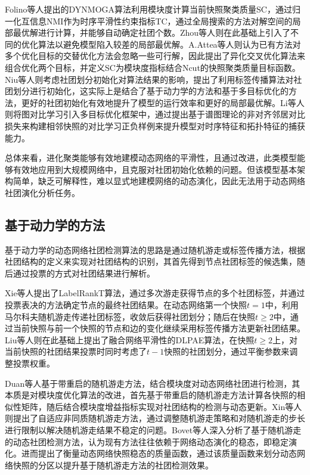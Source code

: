 Folino等人\cite{folino2013evolutionary}提出的DYNMOGA算法利用模块度计算当前快照聚类质量SC，通过归一化互信息NMI作为时序平滑性约束指标TC，通过全局搜索的方法对解空间的局部最优解进行计算，并能够自动确定社团个数。Zhou等人\cite{zhou2015multiobjective,zhou2017multiobjective}则在此基础上引入了不同的优化算法以避免模型陷入较差的局部最优解。A.Attea等人\cite{bara2016new}则认为已有方法对多个优化目标的交替优化方法会忽略一些可行解，因此提出了异化交叉优化算法来组合优化两个目标，并定义SC为模块度指标结合Ncut\cite{NEURIPS2024_a3017a8d}的快照聚类质量目标函数。Niu等人\cite{niu2017label}则考虑社团划分初始化对算法结果的影响，提出了利用标签传播算法对社团划分进行初始化，这实际上是结合了基于动力学的方法和基于多目标优化的方法，更好的社团初始化有效地提升了模型的运行效率和更好的局部最优解。Li等人\cite{LI2025129548}则将图对比学习引入多目标优化框架中，通过提出基于谱图理论的非对齐邻居对比损失来构建相邻快照的对比学习正负样例来提升模型对时序特征和拓扑特征的捕获能力。

总体来看，进化聚类能够有效地建模动态网络的平滑性，且通过改进，此类模型能够有效地应用到大规模网络中，且克服对社团初始化依赖的问题。但该模型基本架构简单，缺乏可解释性，难以显式地建模网络的动态演化，因此无法用于动态网络社团演化分析任务。

\subsection{基于动力学的方法}

基于动力学的动态网络社团检测算法的思路是通过随机游走或标签传播方法，根据社团结构的定义来实现对社团结构的识别，其首先得到节点社团标签的候选集，随后通过投票的方式对社团结果进行解析。

Xie等人\cite{xie2013labelrankt}提出了LabelRankT算法，通过多次游走获得节点的多个社团标签，并通过投票表决的方法确定节点的最终社团结果。在动态网络第一个快照$t=1$中，利用马尔科夫随机游走传递社团标签，收敛后获得社团划分；随后在快照$t \ge 2$中，通过当前快照与前一个快照的节点和边的变化继续采用标签传播方法更新社团结果。Liu等人\cite{liu2015label}则在此基础上提出了融合网络平滑性的DLPAE算法，在快照$t \ge 2$上，对当前快照的社团结果投票时同时考虑了$t-1$快照的社团划分，通过平衡参数来调整投票权重。

Duan等人\cite{duan2009community}基于带重启的随机游走方法，结合模块度对动态网络社团进行检测，其本质是对模块度优化算法的改进，首先基于带重启的随机游走方法计算各快照的相似性矩阵，随后结合模块度增益指标实现对社团结构的检测与动态更新。Xin等人\cite{xin2016adaptive}则提出了自适应非同质随机游走方法，通过调整随机游走策略和对随机游走的步长进行限制以解决随机游走结果不稳定的问题。Bovet等人\cite{doi:10.1126/sciadv.abj3063}深入分析了基于随机游走的动态社团检测方法，认为现有方法往往依赖于网络动态演化的稳态，即稳定演化。进而提出了衡量动态网络快照稳态的质量函数，通过该质量函数来划分动态网络快照的分区以提升基于随机游走方法的社团检测效果。


